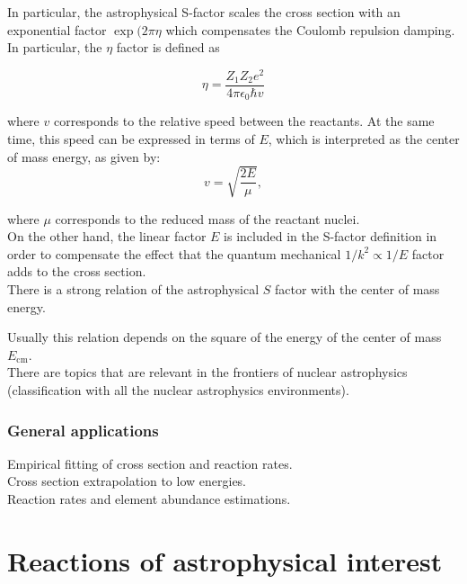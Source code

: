 \documentclass[openany]{book}
\begin{document}
In particular, the astrophysical S-factor scales the cross section with an exponential factor $\exp({2\pi\eta}$ which compensates the Coulomb repulsion damping. In particular, the $\eta$ factor is defined as 

\begin{equation} \label{eq:sfactor_sommerfeld}
	\eta = \frac{Z_1Z_2e^2}{4\pi\epsilon_0\hbar v}
\end{equation}

where $v$ corresponds to the relative speed between the reactants. At the same time, this speed can be expressed in terms of $E$, which is interpreted as the center of mass energy, as given by: \\

\begin{equation}\label{eq:sfactor_speed}
	v = \sqrt{\frac{2E}{\mu}},
\end{equation} 

where $\mu$ corresponds to the reduced mass of the reactant nuclei. \\

On the other hand, the linear factor $E$ is included in the S-factor definition in order to compensate the effect that the quantum mechanical $1/k^2 \propto 1/E$ factor adds to the cross section. \\

There is a strong relation of the astrophysical $S$ factor with the center of mass energy. 

Usually this relation depends on the square of the energy of the center of mass $E_{\mathrm{cm}}$. \\

There are topics that are relevant in the frontiers of nuclear astrophysics  \cite{bertulani_kajino_2016} (classification with all the nuclear astrophysics environments). 

\subsection{General applications} \label{sub:sfactorApplications}

Empirical fitting of cross section and reaction rates. \\

Cross section extrapolation to low energies. \\

Reaction rates and element abundance estimations. 

\chapter{Reactions of astrophysical interest}  \label{ch:reactionsInterest}
\end{document}
